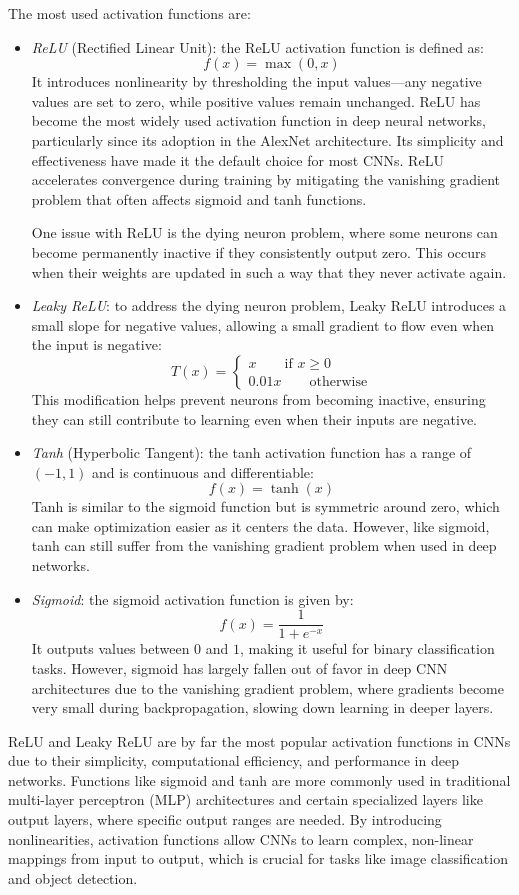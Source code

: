 The most used activation functions are: 
\begin{itemize}
    \item \textit{ReLU} (Rectified Linear Unit): the ReLU activation function is defined as:
        \[f(x)=\max(0,x)\]
        It introduces nonlinearity by thresholding the input values—any negative values are set to zero, while positive values remain unchanged. 
        ReLU has become the most widely used activation function in deep neural networks, particularly since its adoption in the AlexNet architecture. 
        Its simplicity and effectiveness have made it the default choice for most CNNs.
        ReLU accelerates convergence during training by mitigating the vanishing gradient problem that often affects sigmoid and tanh functions.

        One issue with ReLU is the dying neuron problem, where some neurons can become permanently inactive if they consistently output zero. 
        This occurs when their weights are updated in such a way that they never activate again.
    \item \textit{Leaky ReLU}: to address the dying neuron problem, Leaky ReLU introduces a small slope for negative values, allowing a small gradient to flow even when the input is negative:
        \[T(x)=\begin{cases}
            x \qquad\text{if } x \geq 0 \\
            0.01x \qquad\text{otherwise}
        \end{cases}\]
        This modification helps prevent neurons from becoming inactive, ensuring they can still contribute to learning even when their inputs are negative.
    \item \textit{Tanh} (Hyperbolic Tangent): the tanh activation function has a range of $(-1, 1)$ and is continuous and differentiable:
        \[f(x)=\tanh(x)\]
        Tanh is similar to the sigmoid function but is symmetric around zero, which can make optimization easier as it centers the data. 
        However, like sigmoid, tanh can still suffer from the vanishing gradient problem when used in deep networks.
    \item \textit{Sigmoid}: the sigmoid activation function is given by:
        \[f(x)=\dfrac{1}{1+e^{-x}}\]
        It outputs values between $0$ and $1$, making it useful for binary classification tasks. 
        However, sigmoid has largely fallen out of favor in deep CNN architectures due to the vanishing gradient problem, where gradients become very small during backpropagation, slowing down learning in deeper layers.
\end{itemize}
ReLU and Leaky ReLU are by far the most popular activation functions in CNNs due to their simplicity, computational efficiency, and performance in deep networks.
Functions like sigmoid and tanh are more commonly used in traditional multi-layer perceptron (MLP) architectures and certain specialized layers like output layers, where specific output ranges are needed.
By introducing nonlinearities, activation functions allow CNNs to learn complex, non-linear mappings from input to output, which is crucial for tasks like image classification and object detection.

